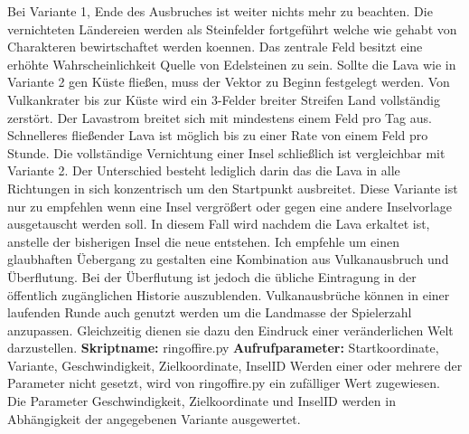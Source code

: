 Bei Variante 1, Ende des Ausbruches ist weiter nichts mehr zu beachten.  Die
vernichteten L{\"a}ndereien werden als Steinfelder fortgef{\"u}hrt welche wie
gehabt von Charakteren bewirtschaftet werden koennen. Das zentrale Feld besitzt
eine erh{\"o}hte Wahrscheinlichkeit Quelle von Edelsteinen zu sein.\newline
\linebreak
Sollte die Lava wie in Variante 2 gen K{\"u}ste flie\ss en, muss der Vektor zu
Beginn festgelegt werden. Von Vulkankrater bis zur K{\"u}ste wird ein 3-Felder
breiter Streifen Land vollst{\"a}ndig zerst{\"o}rt. Der Lavastrom breitet sich
mit mindestens einem Feld pro Tag aus. Schnelleres \glqq flie\ss en\grqq  der
Lava ist m{\"o}glich bis zu einer Rate von einem Feld pro Stunde.\newline
\linebreak
Die vollst{\"a}ndige Vernichtung einer Insel schlie\ss lich ist vergleichbar mit
Variante 2. Der Unterschied besteht lediglich darin das die Lava in alle
Richtungen in sich konzentrisch um den Startpunkt ausbreitet. Diese Variante ist
nur zu empfehlen wenn eine Insel vergr{\"o}\ss ert oder gegen eine andere
Inselvorlage ausgetauscht werden soll. In diesem Fall wird nachdem die Lava
erkaltet ist, anstelle der bisherigen Insel die neue entstehen. Ich empfehle um
einen glaubhaften {\"U}ebergang zu gestalten eine Kombination aus Vulkanausbruch
und {\"U}berflutung. Bei der {\"U}berflutung ist jedoch die {\"u}bliche Eintragung
in der {\"o}ffentlich zug{\"a}nglichen Historie auszublenden.\newline
\newline
Vulkanausbr{\"u}che k{\"o}nnen in einer laufenden Runde auch genutzt werden um
die Landmasse der Spielerzahl anzupassen. Gleichzeitig dienen sie dazu den
Eindruck einer ver{\"a}nderlichen Welt darzustellen.\newline
\newline
\textbf{Skriptname:} ringoffire.py
\newline\newline
\textbf{Aufrufparameter:} Startkoordinate, Variante, Geschwindigkeit,
Zielkoordinate, InselID\newline \newline
Werden einer oder mehrere der Parameter nicht gesetzt, wird von ringoffire.py
ein zuf{\"a}lliger Wert zugewiesen. Die Parameter Geschwindigkeit, Zielkoordinate
und InselID werden in Abh{\"a}ngigkeit der angegebenen Variante ausgewertet.

